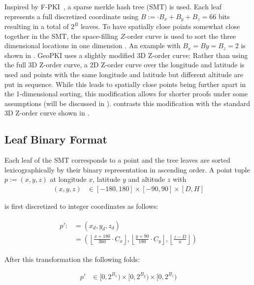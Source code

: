 \documentclass[10pt,conference,compsocconf]{IEEEtran}
\begin{document}
Inspired by F-PKI~\cite{chuat_f-pki_2022}, a sparse merkle hash tree (SMT) is used.
Each leaf represents a full discretized coordinate using $B := \cdot B_{x} + B_{y} + B_{z} = 66$ bits resulting in a total of $2^{B}$ leaves.
To have spatially close points somewhat close together in the SMT, the space-filling $Z$-order curve is used to sort the three dimensional locations in one dimension \cite{morton_computer_1966}.
An example with $B_{x} = B{y} = B_{z} = 2$ is shown in .
GeoPKI uses a slightly modified 3D Z-order curve:
Rather than using the full 3D Z-order curve, a 2D Z-order curve over the longitude and latitude is used and points with the same longitude and latitude but different altitude are put in sequence.
While this leads to spatially close points being further apart in the 1-dimensional sorting, this modification allows for shorter proofs under some assumptions (will be discussed in ).
 contrasts this modification with the standard 3D Z-order curve shown in .

\subsection{Leaf Binary Format}
\label{sec:data-structure:leaf-binary}
Each leaf of the SMT corresponds to a point and the tree leaves are sorted lexicographically by their binary representation in ascending order.
A point tuple $p := (x,y,z)$ at longitude $x$, latitude $y$ and altitude $z$ with
\begin{align*}
	(x, y, z) &\in [-180, 180] \times [-90, 90] \times [D, H]
\end{align*}

is first discretized to integer coordinates as follows:

\begin{align}
\begin{split}
\label{eq:discretization}
p' :&=
(x_d,y_d, z_d)
\\
& =
\left(
%
\left\lfloor
\frac{x + 180}{360} \cdot C_x
\right\rfloor,
%
\left\lfloor
\frac{y + 90}{180} \cdot C_y
\right\rfloor,
%
\left\lfloor
\frac{z - D}{u}
\right\rfloor
%
\right)
\end{split}
\end{align}

After this transformation the following folds:

\begin{align*}
	p' &\in [0, 2^{B_x}) \times [0, 2^{B_y}) \times [0, 2^{B_z})
\end{align*}
\end{document}
